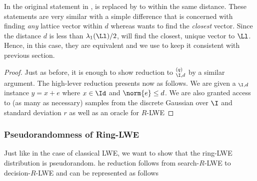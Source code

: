 \begin{remark}
	In the original statement in \cite{ring-lwe},  is replaced by  to within the same distance. These statements are very similar with a simple difference that  is concerned with finding \textit{any} lattice vector within $d$ whereas  wants to find the \textit{closest} vector. Since the distance $d$ is less than $\lambda_1(\Ll)/2$,  will find the closest, unique vector to $\Ll$. Hence, in this case, they are equivalent and we use  to keep it consistent with previous section.
\end{remark}
\begin{proof}
	Just as before, it is enough to show reduction to $^{(q)}_{\I,d}$ by a similar argument. The high-lever reduction presents now as follows. We are given a $_{\I, d}$ instance $y = x + e$ where $x \in \Id$ and $\norm{e} \leq d$. We are also granted access to (as many as necessary) samples from the discrete Gaussian over $\I$ and standard deviation $r$ as well as an oracle for $R$-LWE 
\end{proof}
\subsubsection{Pseudorandomness of Ring-LWE}\label{pseudo-rlwe}
Just like in the case of classical LWE, we want to show that the ring-LWE distribution is pseudorandom. he reduction follows from search-$R$-LWE to decision-$R$-LWE and can be represented as follows\\

\begin{centering}
\end{centering}


